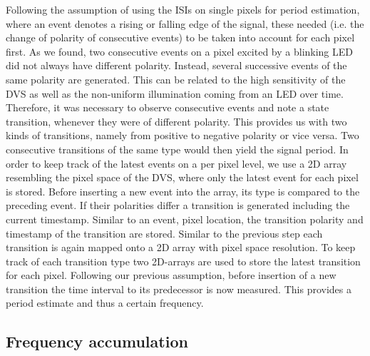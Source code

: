 Following the assumption of using the ISIs on single pixels for period estimation, where an event denotes a rising or falling edge of the signal, these needed (i.e. the change of polarity of consecutive events) to be taken into account for each pixel first. As we found, two consecutive events on a pixel excited by a blinking LED did not always have different polarity. Instead, several successive events of the same polarity are generated. This can be related to the high sensitivity of the DVS as well as the non-uniform illumination coming from an LED over time. Therefore, it was necessary to observe consecutive events and note a state transition, whenever they were of different polarity. This provides us with two kinds of transitions, namely from positive to negative polarity or vice versa. Two consecutive transitions of the same type would then yield the signal period. 
In order to keep track of the latest events on a per pixel level, we use a 2D array resembling the pixel space of the DVS, where only the latest event for each pixel is stored.  Before inserting a new event into the array, its type is compared to the preceding event.  If their polarities differ a transition is generated including the current timestamp. Similar to an event, pixel location, the transition polarity and timestamp of the transition are stored.
Similar to the previous step each transition is again mapped onto a 2D array with pixel space resolution. To keep track of each transition type two 2D-arrays are used to store the latest transition for each pixel. Following our previous assumption, before insertion of a new transition the time interval to its predecessor is now measured. This provides a period estimate and thus a certain frequency.


\subsection{Frequency accumulation}\label{sec:frequencyaccumulation}

